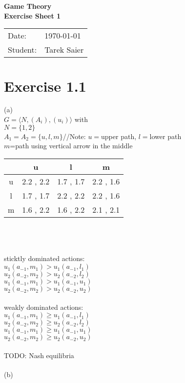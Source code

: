 \documentclass[11pt,a4paper]{article}
\newcommand{\sheetNr}{1}
\begin{document}
\begin{center}
\Huge{\textbf{Game Theory}}\\
\LARGE{\textbf{Exercise Sheet \sheetNr}}
\end{center}
\vspace{2cm}
\begin{tabular}{ll}
Date: & \today\\
Student: & Tarek Saier
\end{tabular}

\section*{Exercise 1.1}
(a)\\
$G=\langle N, (A_i), (u_i)\rangle$ with\\
$N=\{1,2\}$\\
$A_1=A_2=\{u,l,m\}$\hphantom{tabtab}//Note: $u=$upper path, $l=$lower path\\
\hphantom{tabtabtabtabtabtabtabtabtabtabta}$m$=path using vertical arrow in the middle\\

\begin{tabular}{c|c|c|c|}
  & u & l & m\\
\hline
u & 2.2 , 2.2 & 1.7 , 1.7 & 2.2 , 1.6\\
\hline
l & 1.7 , 1.7 & 2.2 , 2.2 & 2.2 , 1.6\\
\hline
m & 1.6 , 2.2 & 1.6 , 2.2 & 2.1 , 2.1\\
\hline
\end{tabular}\\
\\
\\
sticktly dominated actions:\\
$u_1(a_{-1},m_1)>u_1(a_{-1},l_1)$\\
$u_2(a_{-2},m_2)>u_2(a_{-2},l_2)$\\
$u_1(a_{-1},m_1)>u_1(a_{-1},u_1)$\\
$u_2(a_{-2},m_2)>u_2(a_{-2},u_2)$\\
\\
weakly dominated actions:\\
$u_1(a_{-1},m_1)\ge u_1(a_{-1},l_1)$\\
$u_2(a_{-2},m_2)\ge u_2(a_{-2},l_2)$\\
$u_1(a_{-1},m_1)\ge u_1(a_{-1},u_1)$\\
$u_2(a_{-2},m_2)\ge u_2(a_{-2},u_2)$\\
\\
TODO: Nash equilibria\\
\\
(b)

\label{lastpage}
\end{document}
